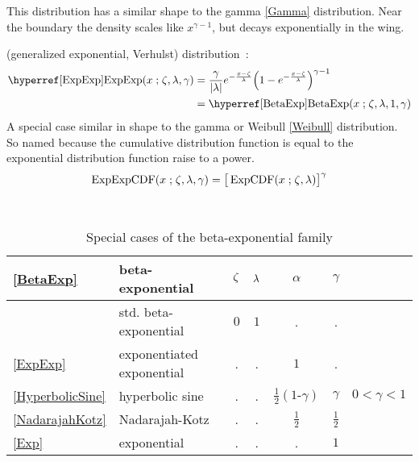 This distribution has a similar shape to the gamma \eqref{Gamma} distribution. Near the boundary the density scales like $x^{\gamma-1}$, but decays exponentially in the wing.






 (generalized exponential, Verhulst) distribution~\cite{Verhulst1847,Ahuja1967,Gupta2001}:
\begin{align}
\label{ExpExp}
\opr{ExpExp}(x\given \pLoc,\pScale,\gamma) 
 &=  \frac{\gamma}{ \Left|\pScale\Right|}
 e^{- \frac{x-\pLoc}{\pScale} }  \Left(1 - e^{-\frac{x-\pLoc}{\pScale}  }\Right)^{\gamma-1} \checked
\\ & = \opr{BetaExp}(x\given \pLoc,\pScale,1, \gamma) \notag \checked
\end{align}
A special case similar in shape to the gamma or Weibull \eqref{Weibull} distribution. So named because the cumulative distribution function is equal to the exponential distribution function raise to a power.
\[
\op{ExpExpCDF}(x\given \pLoc,\pScale,\gamma) = \big[\op{ExpCDF}(x\given \pLoc,\pScale)\big]^{\gamma}
\checked
\notag
\]


\begin{table*}[bt]
\begin{center}
\caption[Beta-exponential distribution -- Special cases]{Special cases of the beta-exponential family}
~\\
{\renewcommand{\arraystretch}{1.25} 
\begin{tabular}{llccccl}
\eqref{BetaExp} & beta-exponential & $\zeta$ & $\lambda$ & $\alpha$ &  $\gamma$ \\
\hline  
 	& std. beta-exponential & $0$ & $1$ & . & . \\
\eqref{ExpExp} 		& exponentiated exponential & . & . & $1$ & . \\
\eqref{HyperbolicSine} & hyperbolic sine 	& . & .  & $\tfrac{1}{2}(1\text{-}\gamma)$ & $\gamma$ & $0<\gamma<1$ \\
\eqref{NadarajahKotz} &  Nadarajah-Kotz 	& . & . & $\tfrac{1}{2}$ & $\tfrac{1}{2}$ \\
\eqref{Exp} & exponential & . & . & . & $1$ \\
\end{tabular} }
\end{center}
\end{table*}



